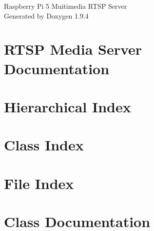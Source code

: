 \documentclass[twoside]{book}
\newcommand{\+}{\discretionary{\mbox{\scriptsize$\hookleftarrow$}}{}{}}
\newcommand{\clearemptydoublepage}{%
    \newpage{\pagestyle{empty}\cleardoublepage}%
  }
\begin{document}
  \raggedbottom
    \hypersetup{pageanchor=false,
                bookmarksnumbered=true,
                pdfencoding=unicode
               }
  \begin{titlepage}
  \vspace*{7cm}
  \begin{center}%
  {\Large Raspberry Pi 5 Muitimedia RTSP Server}\\
  \vspace*{1cm}
  {\large Generated by Doxygen 1.9.4}\\
  \end{center}
  \end{titlepage}
  \clearemptydoublepage
  \tableofcontents
  \clearemptydoublepage
  \hypersetup{pageanchor=true}
\chapter{RTSP Media Server Documentation}
\label{index}\hypertarget{index}{}
\chapter{Hierarchical Index}

\chapter{Class Index}

\chapter{File Index}

\chapter{Class Documentation}




















\end{document}
